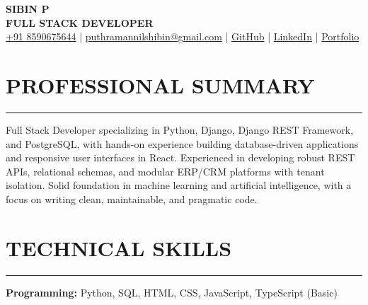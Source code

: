 \documentclass[a4paper,9pt]{article}
\newcommand{\sectionline}{
    \vspace{0pt}
    \hrule
    \vspace{1.5pt}
}
\begin{document}

\begin{center}

    {\fontsize{17}{18}\selectfont\textbf{SIBIN P}}\\[-1pt]

    {\fontsize{10}{11}\selectfont\textbf{FULL STACK DEVELOPER}}\\[3pt]

    {\fontsize{8.5}{10}\selectfont
    \href{tel:+918590675644}{+91 8590675644}
    \quad | \quad
    \href{mailto:puthramannilshibin@gmail.com}
    {puthramannilshibin@gmail.com}
    \quad | \quad
    \href{https://github.com/shibinputhramannil}{GitHub}
    \quad | \quad
    \href{https://www.linkedin.com/in/shibi-ii-a23366437/}{LinkedIn}
    \quad | \quad
    \href{https://sibin-p.vercel.app/}{Portfolio}
    }

\end{center}

\vspace{1pt}


\section*{PROFESSIONAL SUMMARY}
\sectionline

Full Stack Developer specializing in Python, Django, Django REST Framework, and PostgreSQL, with hands-on experience building database-driven applications and responsive user interfaces in React. Experienced in developing robust REST APIs, relational schemas, and modular ERP/CRM platforms with tenant isolation. Solid foundation in machine learning and artificial intelligence, with a focus on writing clean, maintainable, and pragmatic code.


\section*{TECHNICAL SKILLS}
\sectionline

\textbf{Programming:}
Python, SQL, HTML, CSS, JavaScript, TypeScript (Basic)
\end{document}
